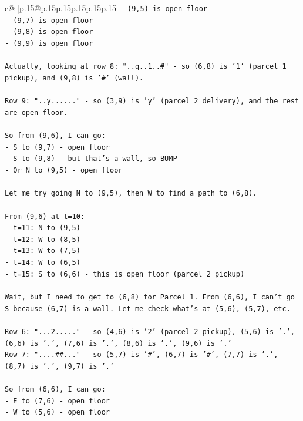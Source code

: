 \documentclass{article}
\begin{document}
{\begin{supertabular}{c@{$\;$}|p{.15\linewidth}@{}p{.15\linewidth}p{.15\linewidth}p{.15\linewidth}p{.15\linewidth}p{.15\linewidth}}
{{{\texttt{{-} (9,5) is open floor} \\
\texttt{{-} (9,7) is open floor} \\
\texttt{{-} (9,8) is open floor} \\
\texttt{{-} (9,9) is open floor} \\
\\ 
\texttt{Actually, looking at row 8: "..q..1..\#" {-} so (6,8) is '1' (parcel 1 pickup), and (9,8) is '\#' (wall).} \\
\\ 
\texttt{Row 9: "..y......" {-} so (3,9) is 'y' (parcel 2 delivery), and the rest are open floor.} \\
\\ 
\texttt{So from (9,6), I can go:} \\
\texttt{{-} S to (9,7) {-} open floor} \\
\texttt{{-} S to (9,8) {-} but that's a wall, so BUMP} \\
\texttt{{-} Or N to (9,5) {-} open floor} \\
\\ 
\texttt{Let me try going N to (9,5), then W to find a path to (6,8).} \\
\\ 
\texttt{From (9,6) at t=10:} \\
\texttt{{-} t=11: N to (9,5)} \\
\texttt{{-} t=12: W to (8,5)} \\
\texttt{{-} t=13: W to (7,5)} \\
\texttt{{-} t=14: W to (6,5)} \\
\texttt{{-} t=15: S to (6,6) {-} this is open floor (parcel 2 pickup)} \\
\\ 
\texttt{Wait, but I need to get to (6,8) for Parcel 1. From (6,6), I can't go S because (6,7) is a wall. Let me check what's at (5,6), (5,7), etc.} \\
\\ 
\texttt{Row 6: "...2....." {-} so (4,6) is '2' (parcel 2 pickup), (5,6) is '.', (6,6) is '.', (7,6) is '.', (8,6) is '.', (9,6) is '.'} \\
\texttt{Row 7: "....\#\#..." {-} so (5,7) is '\#', (6,7) is '\#', (7,7) is '.', (8,7) is '.', (9,7) is '.'} \\
\\ 
\texttt{So from (6,6), I can go:} \\
\texttt{{-} E to (7,6) {-} open floor} \\
\texttt{{-} W to (5,6) {-} open floor} \\
}}}
\end{supertabular}}
\end{document}
